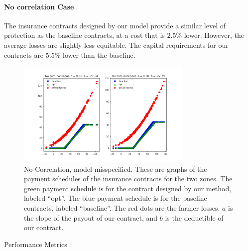 \documentclass[11pt]{article}
\begin{document}
      \paragraph{No correlation Case} The insurance contracts designed by our model provide a similar level of protection as the baseline contracts, at a cost that is $2.5\%$ lower. However, the average losses are slightly less equitable. The capital requirements for our contracts are $5.5\%$ lower than the baseline. 
      \begin{figure}[H]
          \centering
          \includegraphics[width=0.75\textwidth]{../../output/figures/Exploration/no_correlation_nonlinear.png}
          \caption{No Correlation, model misspecified. These are graphs of the payment schedules of the insurance contracts for the two zones. The green payment schedule is for the contract designed by our method, labeled ``opt''. The blue payment schedule is for the baseline contracts, labeled ``baseline''. The red dots are the farmer losses. $a$ is the slope of the payout of our contract, and $b$ is the deductible of our contract.}
      \end{figure}

      \begin{table}[H]
          \centering
          \small
          \caption{Performance Metrics}
          
      \end{table}
      \FloatBarrier
\end{document}
